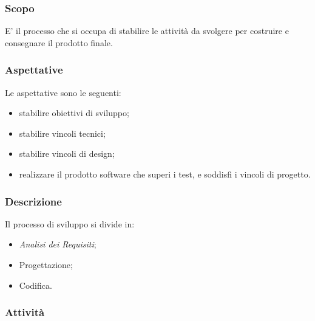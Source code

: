 		\subsubsection{Scopo}E' il processo che si occupa di stabilire le attività da svolgere per costruire e consegnare il prodotto finale.
		\subsubsection{Aspettative}
		Le aspettative sono le seguenti:
			\begin{itemize}
				\item stabilire obiettivi di sviluppo;
				\item stabilire vincoli tecnici;
				\item stabilire vincoli di design;
				\item realizzare il prodotto software che superi i test, e soddisfi i vincoli di progetto.
			\end{itemize}
		\subsubsection{Descrizione}
			Il processo di sviluppo si divide in:
				\begin{itemize}
					\item \textit{Analisi dei Requisiti};
					\item Progettazione;
					\item Codifica.
				\end{itemize}
		\subsubsection{Attività}
